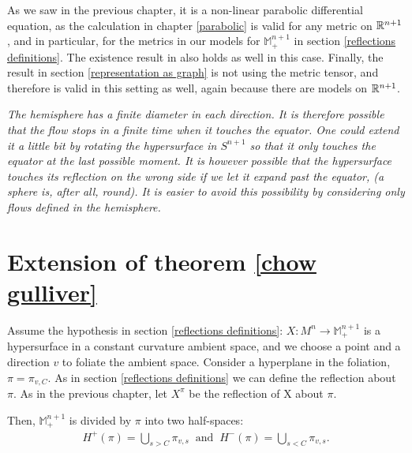 As we saw in the previous chapter, it is a non-linear parabolic differential equation, as the calculation in chapter \ref{parabolic} is valid for any metric on $\mathbb{R}^{n+1}$, and in particular, for the metrics in our models for $\mathbb{M}^{n+1}_+$ in section \ref{reflections definitions}. The existence result in \cite{huisken} also holds as well in this case. Finally, the result in section \ref{representation as graph} is not using the metric tensor, and therefore is valid in this setting as well, again because there are models on $\mathbb{R}^{n+1}$. 
\begin{oss}
	\em
	The hemisphere has a finite diameter in each direction. It is therefore possible that the flow stops in a finite time when it touches the equator. One could extend it a little bit by rotating the hypersurface in $S^{n+1}$ so that it only touches the equator at the last possible moment. It is however possible that the hypersurface touches its reflection {\em on the wrong side} if we let it expand past the equator, (a sphere is, after all, round). It is easier to avoid this possibility by considering only flows defined in the hemisphere. 
\end{oss}
\section{Extension of theorem \ref{chow gulliver}}	


Assume the hypothesis in section \ref{reflections definitions}: $X:M^n\rightarrow \mathbb{M}^{n+1}_+$ is a hypersurface in a constant curvature ambient space, and we choose a point and a direction $v$ to foliate the ambient space. Consider a hyperplane in the foliation, $\pi=\pi_{v, C}$. As in section \ref{reflections definitions} we can define the reflection about $\pi$. As in the previous chapter, let $X^\pi$ be the reflection of X about $\pi$.

Then, $\mathbb{M}^{n+1}_+$ is divided by $\pi$ into two half-spaces:
\begin{align*}
	H^+(\pi)= \bigcup_{s>C} \pi_{v, s} \;\;\mathrm{and}\;\;	H^-(\pi)= \bigcup_{s<C} \pi_{v, s}.
\end{align*} 

